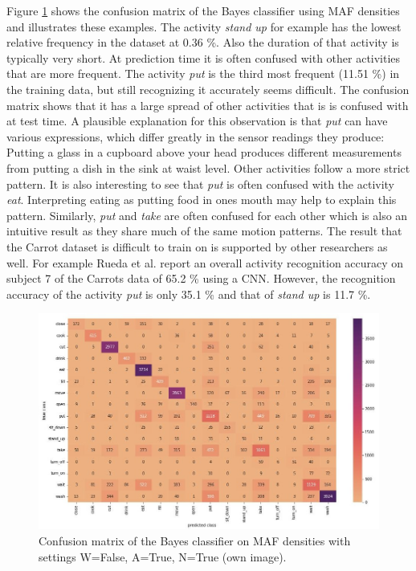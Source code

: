 \documentclass[11pt,titlepage,oneside,openany]{book}
\begin{document}
Figure \ref{fig:conf} shows the confusion matrix of the Bayes classifier using MAF densities and illustrates these examples. The activity \emph{stand up} for example has the lowest relative frequency in the dataset at 0.36 \%. Also the duration of that activity is typically very short. At prediction time it is often confused with other activities that are more frequent. The activity \emph{put} is the third most frequent (11.51 \%) in the training data, but still recognizing it accurately seems difficult. The confusion matrix shows that it has a large spread of other activities that is is confused with at test time. A plausible explanation for this observation is that \emph{put} can have various expressions, which differ greatly in the sensor readings they produce: Putting a glass in a cupboard above your head produces different measurements from putting a dish in the sink at waist level. Other activities follow a more strict pattern. It is also interesting to see that \emph{put} is often confused with the activity \emph{eat}. Interpreting eating as putting food in ones mouth may help to explain this pattern. Similarly, \emph{put} and \emph{take} are often confused for each other which is also an intuitive result as they share much of the same motion patterns. The result that the Carrot dataset is difficult to train on is supported by other researchers as well. For example Rueda et al. \cite{rueda_combining_2019} report an overall activity recognition accuracy on subject 7 of the Carrots data of 65.2 \% using a CNN. However, the recognition accuracy of the activity \emph{put} is only 35.1 \% and that of \emph{stand up} is 11.7 \%.

\begin{figure}[h]
	\centering
	\includegraphics[width=\linewidth]{conf_mat.jpg}
	\caption[Confusion matrix Carrot]{Confusion matrix of the Bayes classifier on MAF densities with settings W=False, A=True, N=True (own image).}
	\label{fig:conf}
\end{figure}
\end{document}
